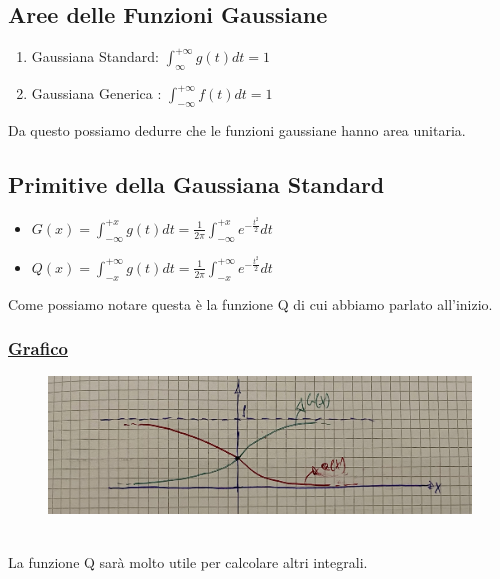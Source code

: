 \documentclass{article}
\begin{document}
\subsection{Aree delle Funzioni Gaussiane}
\begin{enumerate}
    \item Gaussiana Standard: $\int_{\infty}^{+\infty}g(t)dt=1$
    \item Gaussiana Generica : $\int_{-\infty}^{+\infty}f(t)dt=1$
\end{enumerate} 
Da questo possiamo dedurre che le funzioni gaussiane hanno area unitaria.

\subsection{Primitive della Gaussiana Standard}
\begin{itemize}
    \item $G(x)=\int_{-\infty}^{+x}g(t)dt=\frac1{2\pi}\int_{-\infty}^{+x}e^{-\frac{t^2}2}dt$
    \item $Q(x)=\int_{-x}^{+\infty}g(t)dt=\frac1{2\pi}\int_{-x}^{+\infty}e^{-\frac{t^2}2}dt$
\end{itemize} 
Come possiamo notare questa è la funzione Q di cui abbiamo parlato
all'inizio.
\subsubsection{\underline{Grafico}}
\begin{figure}[ht]
\centering
\includegraphics[scale=0.15]{images/8.Q_G.jpeg}
\end{figure} ~\\
La funzione Q sarà molto utile per calcolare altri integrali.
\end{document}
